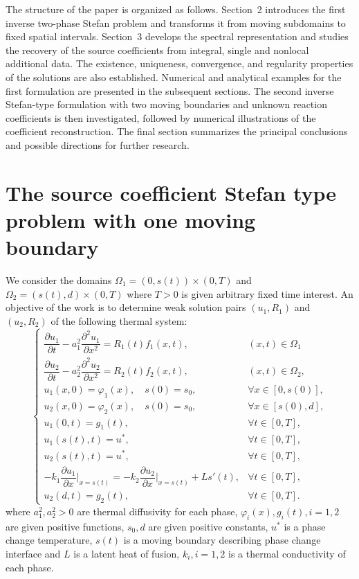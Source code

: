 \documentclass[preprint,12pt,authoryear]{elsarticle}
\begin{document}
The structure of the paper is organized as follows. Section~2 introduces the first inverse two-phase Stefan problem and transforms it from moving subdomains to fixed spatial intervals. Section~3 develops the spectral representation and studies the recovery of the source coefficients from integral, single and nonlocal additional data. The existence, uniqueness, convergence, and regularity properties of the solutions are also established. Numerical and analytical examples for the first formulation are presented in the subsequent sections. The second inverse Stefan-type formulation with two moving boundaries and unknown reaction coefficients is then investigated, followed by numerical illustrations of the coefficient
reconstruction. The final section summarizes the principal conclusions and possible directions for further research.




\section{The source coefficient Stefan type problem with one moving boundary}
We consider the domains $\Omega_1=(0,s(t))\times(0,T)$ and $\Omega_2=(s(t),d)\times(0,T)$ where $T>0$ is given arbitrary fixed time interest. An objective of the work is to determine weak solution pairs $(u_1, R_1)$ and $(u_2,R_2)$ of the following thermal system:
\begin{equation}\label{eq1}
    \begin{cases}
        \dfrac{\partial u_1}{\partial t}-a_1^2\dfrac{\partial^2 u_1}{\partial x^2}=R_1(t)f_1(x,t),& (x,t)\in \Omega_1\\
        \dfrac{\partial u_2}{\partial t}-a_2^2\dfrac{\partial^2 u_2}{\partial x^2}=R_2(t)f_2(x,t),& (x,t)\in \Omega_2,\\
        u_1(x,0)=\varphi_1(x),\quad s(0)=s_0,& \forall x\in[0,s(0)],\\
        u_2(x,0)=\varphi_2(x),\quad s(0)=s_0,& \forall x\in[s(0),d],\\
        u_1(0,t)=g_1(t),&\forall t\in[0,T],\\
        u_1(s(t),t)=u^*,& \forall t\in[0,T],\\
        u_2(s(t),t)=u^*,& \forall t\in[0,T],\\
        -k_1\dfrac{\partial u_1}{\partial x}\bigg|_{x=s(t)}=-k_2\dfrac{\partial u_2}{\partial x}\bigg|_{x=s(t)}+L s'(t),&\forall t\in[0,T],\\
        u_2(d,t)=g_2(t),&\forall t\in[0,T].
    \end{cases}
\end{equation}
where $a_1^2,a_2^2>0$ are thermal diffusivity for each phase, $\varphi_i(x), g_i(t), i=1,2$ are given positive functions, $s_0, d$ are given positive constants, $u^*$ is a phase change temperature, $s(t)$ is a moving boundary describing phase change interface and $L$ is a latent heat of fusion, $k_i, i=1,2$ is a thermal conductivity of each phase.
\end{document}
